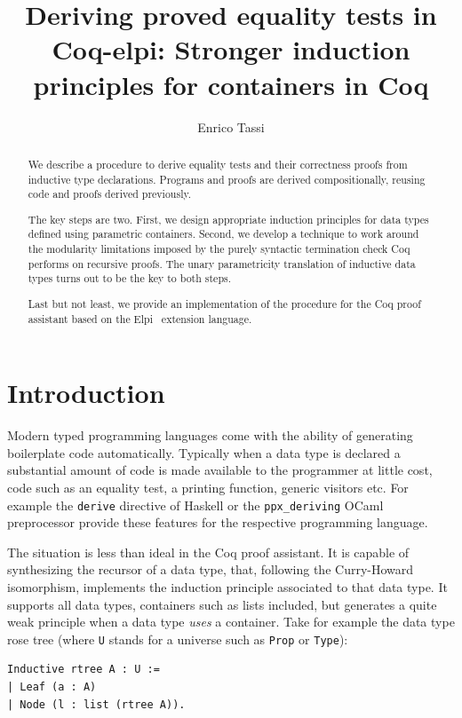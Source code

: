 \documentclass[a4paper,UKenglish,cleveref, autoref]{lipics-v2019}
\title{Deriving proved equality tests in Coq-elpi: Stronger induction principles for containers in Coq}
\author{Enrico Tassi}{Universit\'e c\^ote d'Azur - Inria}{Enrico.Tassi@inria.fr}{}{}          %
\begin{document}
\maketitle

\begin{abstract}
We describe a procedure to derive equality tests and their correctness
proofs from inductive type declarations.  Programs and proofs
are derived compositionally, reusing code and proofs derived
previously.  

The key steps are two. First, we
design appropriate induction principles for data types defined
using parametric containers. Second, we
develop a technique to work around the modularity limitations
imposed by the purely syntactic termination check Coq performs
on recursive proofs. 
The unary parametricity translation of inductive data types
turns out to be the key to both steps.

Last but not least, we provide an implementation of the procedure
	for the Coq proof assistant based on the Elpi~\cite{dunchev:hal-01176856} extension language.
\end{abstract}


\section{Introduction}

Modern typed programming languages come with the ability of generating
boilerplate code automatically. Typically when a data type is declared
a substantial amount of code is made available to the programmer at
little cost, code such as an equality test, a printing function,
generic visitors etc.  For example the \lstinline+derive+ directive of
Haskell or the
\lstinline+ppx_deriving+ OCaml preprocessor
provide these features for the respective programming language.

The situation is less than ideal in the Coq proof assistant.  It is
capable of synthesizing the recursor of a data type, that,
following the Curry-Howard isomorphism, implements the induction
principle associated to that data type. It supports all data types,
containers such as lists included, but generates a quite weak
principle when a data type \emph{uses} a container.
Take for  example the data type rose tree (where \lstinline+U+ stands for a universe such as \lstinline+Prop+ or \lstinline+Type+):

\begin{lstlisting}
Inductive rtree A : U :=
| Leaf (a : A)
| Node (l : list (rtree A)).
\end{lstlisting}
\end{document}
